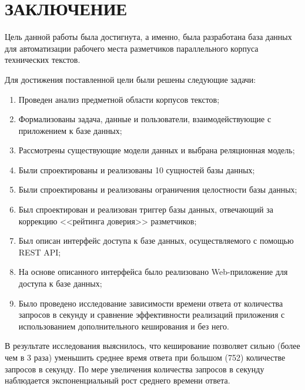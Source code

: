 \section*{ЗАКЛЮЧЕНИЕ}

Цель данной работы была достигнута, а именно, была разработана база данных для автоматизации рабочего места разметчиков параллельного корпуса технических текстов.

Для достижения поставленной цели были решены следующие задачи:
\begin{enumerate}
    \item Проведен анализ предметной области корпусов текстов;
    \item Формализованы задача, данные и пользователи, взаимодействующие с приложением к базе данных;
    \item Рассмотрены существующие модели данных и выбрана реляционная модель;
    \item Были спроектированы и реализованы 10 сущностей базы данных;
    \item Были спроектированы и реализованы ограничения целостности базы данных;
    \item Был спроектирован и реализован триггер базы данных, отвечающий за коррекцию <<рейтинга доверия>> разметчиков;
    \item Был описан интерфейс доступа к базе данных, осуществляемого с помощью REST API;
    \item На основе описанного интерфейса было реализовано Web-приложение для доступа к базе данных;
    \item Было проведено исследование зависимости времени ответа от количества запросов в секунду и сравнение эффективности реализаций приложения с использованием дополнительного кеширования и без него.
\end{enumerate}

В результате исследования выяснилось, что кеширование позволяет сильно (более чем в 3 раза) уменьшить среднее время ответа при большом (752) количестве запросов в секунду.
По мере увеличения количества запросов в секунду наблюдается экспоненциальный рост среднего времени ответа.

